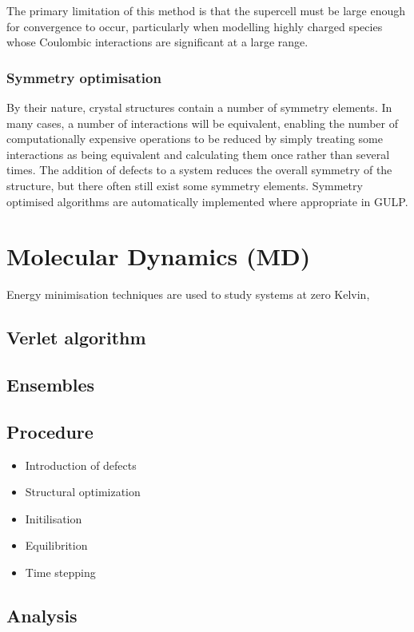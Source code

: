 The primary limitation of this method is that the supercell must be large enough for convergence to occur, particularly when modelling highly charged species whose Coulombic interactions are significant at a large range.

\subsubsection{Symmetry optimisation} %
By their nature, crystal structures contain a number of symmetry elements.
In many cases, a number of interactions will be equivalent, enabling the number of computationally expensive operations to be reduced by simply treating some interactions as being equivalent and calculating them once rather than several times.
The addition of defects to a system reduces the overall symmetry of the structure, but there often still exist some symmetry elements.
Symmetry optimised algorithms are automatically implemented where appropriate in GULP.

\section{Molecular Dynamics (MD)}
\label{sec:MD}
Energy minimisation techniques are used to study systems at zero Kelvin, 

\subsection{Verlet algorithm}

\subsection{Ensembles}

\subsection{Procedure}
\begin{itemize}
	\item Introduction of defects
	\item Structural optimization
	\item Initilisation
	\item Equilibrition
	\item Time stepping
\end{itemize}
\subsection{Analysis}
